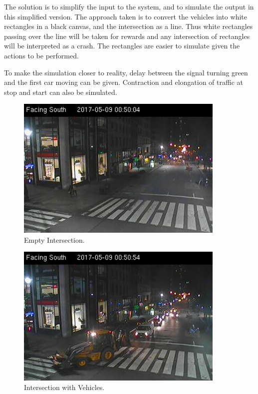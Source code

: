 \documentclass[a4paper,11pt]{report}
\begin{document}
				The solution is to simplify the input to the system, and to simulate the output in this simplified version. The approach taken is to convert the vehicles into white rectangles in a black canvas, and the intersection as a line. Thus white rectangles passing over the line will be taken for rewards and any intersection of rectangles will be interpreted as a crash. The rectangles are easier to simulate given the actions to be performed.

				To make the simulation closer to reality, delay between the signal turning green and the first car moving can be given. Contraction and elongation of traffic at stop and start can also be simulated.

				\begin{figure}[H]
					\begin{centering}
						\includegraphics[width=10cm]{images/traffic1.png}
						\caption{Empty Intersection.}
					\end{centering}
				\end{figure}

				
				\begin{figure}[H]
					\begin{centering}
						\includegraphics[width=10cm]{images/traffic2.png}
						\caption{Intersection with Vehicles.}
					\end{centering}
				\end{figure}
\end{document}
